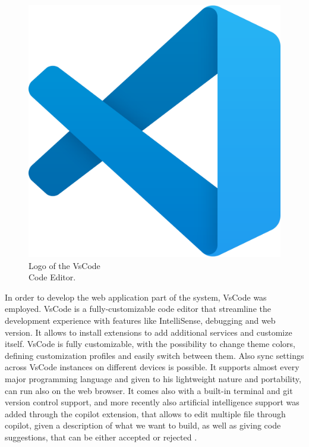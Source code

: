 \begin{figure} %
    \captionsetup{font=footnotesize}
    \centering
    \includegraphics[width=\linewidth]{images/vs_code.png}
    \caption{Logo of the VsCode\\Code Editor.}
\end{figure}

In order to develop the web application part of the system, VsCode was employed. VsCode is a fully-customizable code editor that streamline the development experience with features like IntelliSense, debugging and web version. It allows to install extensions to add additional services and customize itself. VsCode is fully customizable, with the possibility to change theme colors, defining customization profiles and easily switch between them. Also sync settings across VsCode instances on different devices is possible. It supports almost every major programming language and given to his lightweight nature and portability, can run also on the web browser. It comes also with a built-in terminal and git version control support, and more recently also artificial intelligence support was added through the copilot extension, that allows to edit multiple file through copilot, given a description of what we want to build, as well as giving code suggestions, that can be either accepted or rejected \cite{VsCode}. 
\newpage
